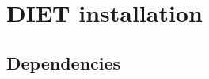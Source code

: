 
\chapter{DIET installation}
\label{ch:installing}

\section{Dependencies}
\label{sec:dependencies}

